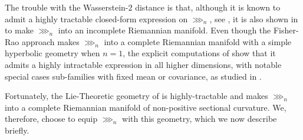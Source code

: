 

The trouble with the Wasserstein-$2$ distance is that, although it is known to admit a highly tractable closed-form expression on $\ggg_n$, see \cite{SimpleWasserstein2}, it is also shown in \cite{Wasserstein2Gaussian} to make $\ggg_n$ into an incomplete Riemannian manifold.  Even though the Fisher-Rao approach makes $\ggg_n$ into a complete Riemannian manifold with a simple hyperbolic geometry when $n=1$, the explicit computations of \cite{GeometryOfMultivariateNormal_Fisher_Rao} show that it admits a highly intractable expression in all higher dimensions, with notable special cases sub-families with fixed mean or covariance, as studied in \cite{}.  

Fortunately, the Lie-Theoretic geometry of \cite{GeometryOfMultivariateNormal_Lie_Canada} is highly-tractable and makes $\ggg_n$ into a complete Riemannian manifold of non-positive sectional curvature.  We, therefore, choose to equip $\ggg_n$ with this geometry, which we now describe briefly.    

